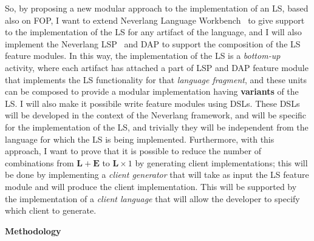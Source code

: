 So, by proposing a new modular approach to the implementation of an LS, based also on FOP, I want to extend Neverlang Language Workbench~\cite{Cazzola15c, Cazzola14c} to give support to the implementation of the LS for any artifact of the language, and I will also implement the Neverlang LSP~\cite{Cazzola19} and DAP to support the composition of the LS feature modules.
In this way, the implementation of the LS is a \textit{bottom-up} activity, where each artifact has attached a part of LSP and DAP feature module that implements the LS functionality for that \textit{language fragment}, and these units can be composed to provide a modular implementation having \textbf{variants} of the LS.
I will also make it possibile write feature modules using DSLs.
These DSLs will be developed in the context of the Neverlang framework, and will be specific for the implementation of the LS, and trivially they will be independent from the language for which the LS is being implemented.
Furthermore, with this approach, I want to prove that it is possible to reduce the number of combinations from $\mathbf{L} + \mathbf{E}$ to $\mathbf{L} \times 1$ by generating client implementations; this will be done by implementing a \textit{client generator} that will take as input the LS feature module and will produce the client implementation. This will be supported by the implementation of a \textit{client language} that will allow the developer to specify which client to generate.

\hfill \break
\noindent
\textbf{Methodology}

